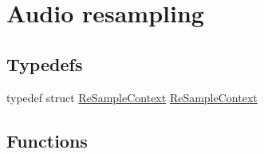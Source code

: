 \hypertarget{group__lavc__resample}{}\section{Audio resampling}
\label{group__lavc__resample}
\subsection*{Typedefs}
\begin{DoxyCompactItemize}
\item 
typedef struct \hyperlink{group__lavc__resample_ga0051f36cfec3437423a131c085ff5ea2}{Re\+Sample\+Context} \hyperlink{group__lavc__resample_ga0051f36cfec3437423a131c085ff5ea2}{Re\+Sample\+Context}
\end{DoxyCompactItemize}
\subsection*{Functions}
